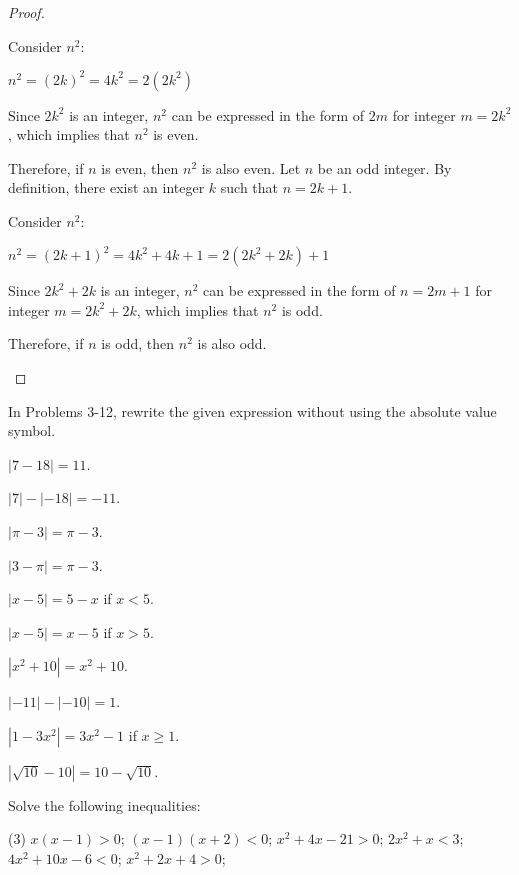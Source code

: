 \begin{questions}
\begin{proof}
\begin{tasks}
      Consider $n^2$:

      $n^2=(2k)^2=4k^2=2(2k^2)$

      Since $2k^2$ is an integer, $n^2$ can be expressed in the form of $2m$ for integer $m=2k^2$, which implies that $n^2$ is even.

      Therefore, if $n$ is even, then $n^2$ is also even.
      \task Let $n$ be an odd integer. By definition, there exist an integer $k$ such that $n=2k+1$.

      Consider $n^2$:

      $n^2=(2k+1)^2 = 4k^2+4k+1=2(2k^2+2k) + 1$

      Since $2k^2+2k$ is an integer, $n^2$ can be expressed in the form of $n = 2m+1$ for integer $m=2k^2+2k$, which implies that $n^2$ is odd.

      Therefore, if $n$ is odd, then $n^2$ is also odd.
    \end{tasks}
  \end{proof}
  In Problems 3-12, rewrite the given expression without using the absolute value symbol.
  \begin{solution}
    \item $ \left| 7 - 18 \right| = 11 $.
    \item $ \left| 7 \right| - \left| - 18 \right| = -11 $.
    \item $ \left| \pi - 3\right| = \pi - 3 $.
    \item $ \left| 3 - \pi \right| = \pi - 3 $.
    \item $ \left| x - 5 \right| = 5 - x $ if $ x < 5 $.
    \item $ \left| x - 5 \right| = x - 5 $ if $ x > 5 $.
    \item $ \left| x^2 + 10 \right| = x^2 + 10$.
    \item $ \left| -11 \right| - \left| -10 \right| = 1 $.
    \item $ \left| 1 - 3x^2 \right| = 3x^2 - 1 $ if $ x \geq 1 $.
    \item $ \left| \sqrt{10} - 10 \right| = 10 - \sqrt{10} $.
  \end{solution}
  \item Solve the following inequalities:
  \begin{tasks}(3)
    \task $ x(x - 1) > 0 $;
    \task $ (x - 1)(x + 2) < 0 $;
    \task $ x^2 + 4x - 21 > 0 $;
    \task $ 2x^2 + x < 3 $;
    \task $ 4x^2 + 10x - 6 < 0 $;
    \task $ x^2 + 2x + 4 > 0 $;
  \end{tasks}
  \begin{note}
    \begin{multicols}{2}
\end{multicols}
\end{note}
\end{questions}
